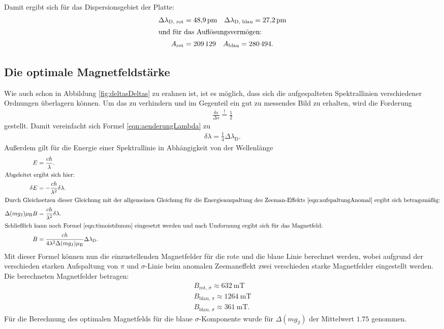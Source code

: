 Damit ergibt sich für das Dispersionsgebiet der Platte:
\begin{align}
  \Delta \lambda_\text{D, rot} &= \SI{48.9}{\pico\meter} \quad \Delta \lambda_\text{D, blau} = \SI{27.2}{\pico\meter}\\
\intertext{und für das Auflösungsvermögen:}
  A_\text{rot} &= \num{209129} \quad A_\text{blau} = \num{280494}.
\end{align}

\subsection{Die optimale Magnetfeldstärke}

Wie auch schon in Abbildung \ref{fig:deltasDeltas} zu erahnen ist, ist es möglich, dass sich die aufgespalteten Spektrallinien verschiedener Ordnungen überlagern können. Um das zu verhindern und im Gegenteil ein gut zu messendes Bild zu erhalten, wird die Forderung
\begin{align}
  \frac{\delta s}{\Delta s} \overset{!}{=} \frac{1}{2}
\end{align}
gestellt.
Damit vereinfacht sich Formel \eqref{eqn:aenderungLambda} zu
\begin{align}
  \delta \lambda = \frac{1}{4} \Delta \lambda_\text{D}.\label{eqn:timoistdumm}
\end{align}
Außerdem gilt für die Energie einer Spektrallinie in Abhängigkeit von der Wellenlänge
\begin{align}
  E &= \frac{c h}{\lambda}.\\
\intertext{Abgeleitet ergibt sich hier:}
  \delta E &= -\frac{c h}{\lambda^2} \delta \lambda.\\
\intertext{Durch Gleichsetzen dieser Gleichung mit der allgemeinen Gleichung für die Energieauspaltung des Zeeman-Effekts \eqref{eqn:aufspaltungAnomal} ergibt sich betragsmäßig:}
\Delta (m g_\text{J}) \mu_\text{B} B &= \frac{c h}{\lambda^2} \delta \lambda.\\
\intertext{Schließlich kann noch Formel \eqref{eqn:timoistdumm} eingesetzt werden und nach Umformung ergibt sich für das Magnetfeld:}
B &= \frac{c h}{4 \lambda^2 \Delta (m g_\text{J}) \mu_\text{B}} \Delta \lambda_\text{D}.\label{eqn:optimalesMagnetfeld}
\end{align}
Mit dieser Formel können nun die einzustellenden Magnetfelder für die rote und die blaue Linie berechnet werden, wobei aufgrund der verschieden starken Aufspaltung von $\pi$ und $\sigma$-Linie beim anomalen Zeemaneffekt zwei verschieden starke Magnetfelder eingestellt werden.
Die berechneten Magnetfelder betragen:
\begin{align}
  B_\text{rot, $\sigma$} \approx \SI{632}{\milli\tesla}\\
  B_\text{blau, $\pi$} \approx \SI{1264}{\milli\tesla}\\
  B_\text{blau, $\sigma$} \approx \SI{361}{\milli\tesla}.
\end{align}
Für die Berechnung des optimalen Magnetfelds für die blaue $\sigma$-Komponente wurde für $\Delta (m g_\text{J})$ der Mittelwert $1.75$ genommen.

